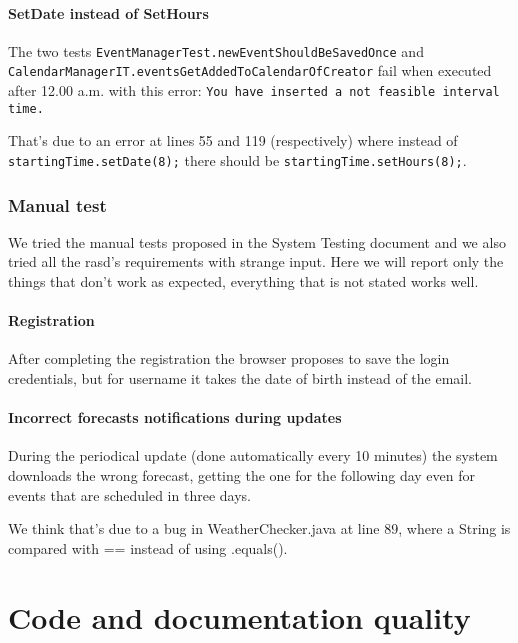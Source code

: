 \documentclass[10pt,a4paper,titlepage]{article}
\begin{document}
\subsection{SetDate instead of SetHours}
The two tests \texttt{EventManagerTest.newEventShouldBeSavedOnce} and\\ \texttt{CalendarManagerIT.eventsGetAddedToCalendarOfCreator} fail when executed after 12.00 a.m. with this error: \texttt{You have inserted a not feasible interval time.}

That's due to an error at lines 55 and 119 (respectively) where instead of \texttt{startingTime.setDate(8);} there should be \texttt{startingTime.setHours(8);}.

\section{Manual test}
We tried the manual tests proposed in the System Testing document and we also tried all the rasd's requirements with strange input. Here we will report only the things that don't work as expected, everything that is not stated works well.

\subsection{Registration}
After completing the registration the browser proposes to save the login credentials, but for username it takes the date of birth instead of the email.

\subsection{Incorrect forecasts notifications during updates}
During the periodical update (done automatically every 10 minutes) the system downloads the wrong forecast, getting the one for the following day even for events that are scheduled in three days.

We think that's due to a bug in WeatherChecker.java at line 89, where a String is compared with == instead of using .equals().

\pagebreak
\part{Code and documentation quality}
\label{part4}
\end{document}

